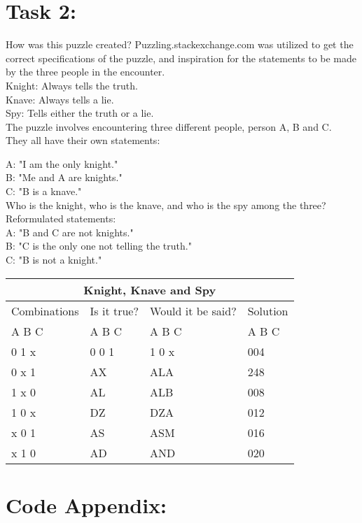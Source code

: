 \documentclass[11pt]{amsart}
\begin{document}
\section{Task 2:}

How was this puzzle created?
	Puzzling.stackexchange.com was utilized to get the correct specifications of the puzzle,
	and inspiration for the statements to be made by the three people in the encounter. \\

Knight: Always tells the truth.\\
Knave: 	Always tells a lie.\\
Spy: 		Tells either the truth or a lie. \\

The puzzle involves encountering three different people, person A, B and C. \\

They all have their own statements:

	A: "I am the only knight."\\
	B: "Me and A are knights."\\
	C: "B is a knave." \\

Who is the knight, who is the knave, and who is the spy among the three? \\


Reformulated statements:\\

	A: "B and C are not knights."\\
	B: "C is the only one not telling the truth."\\
	C: "B is not a knight." \\



	\begin{tabular}{ |p{3cm}||p{3cm}|p{3cm}|p{3cm}|  }
	 \hline
	 \multicolumn{4}{|c|}{Knight, Knave and Spy} \\
	 \hline
	 Combinations & Is it true? & Would it be said? & Solution  \\ A  B  C   &   A  B  C  &   A  B  C & A  B  C \\
	 \hline
	 0  1  x   & 0  0  1    & 1  0  x&   004\\
	 0  x  1&   AX  & ALA   &248\\
	 1  x  0 &AL & ALB&  008\\
	 1  0  x    &DZ & DZA&  012\\
	 x  0  1&   AS  & ASM&016\\
	 x  1  0& AD  & AND   &020\\

	 
	 \hline
	\end{tabular}


\section{Code Appendix:}

\begin{verbatim}



\end{verbatim}
\end{document}
